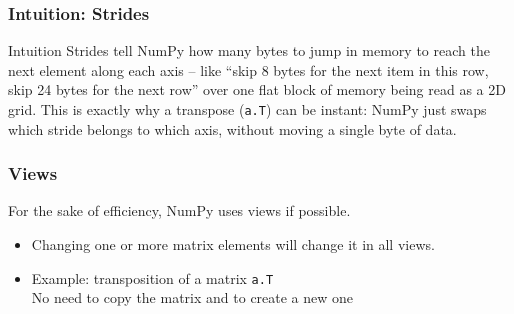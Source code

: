 \begin{frame}[fragile]\frametitle{Intuition: Strides}
\begin{block}{Intuition}
Strides tell NumPy how many bytes to jump in memory to reach the next element along each axis --
like ``skip 8 bytes for the next item in this row, skip 24 bytes for the next row'' over one flat
block of memory being read as a 2D grid. This is exactly why a transpose (\lstinline{a.T}) can
be instant: NumPy just swaps which stride belongs to which axis, without moving a single byte of
data.
\end{block}
\end{frame}

\begin{frame}[fragile]\frametitle{Views}
 For the sake of efficiency, NumPy uses views if possible.

 \begin{itemize}
  \item Changing one or more matrix elements will change it in all views.
  \item Example: transposition of a matrix \lstinline{a.T}\\
        No need to copy the matrix and to create a new one
 \end{itemize}

\end{frame}

